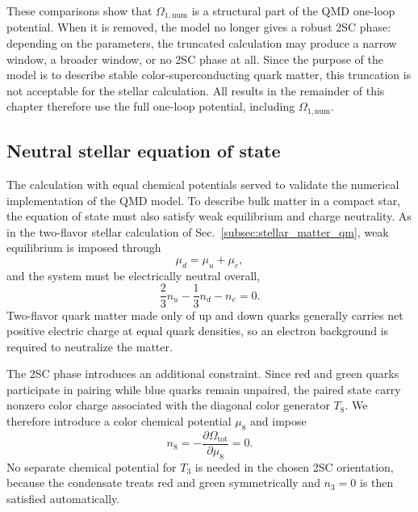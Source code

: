 These comparisons show that \(\Omega_{1,\mathrm{num}}\) is a structural
part of the QMD one-loop potential. When it is removed, the model no
longer gives a robust 2SC phase: depending on the parameters, the
truncated calculation may produce a narrow window, a broader window, or
no 2SC phase at all. Since the purpose of the model is to describe
stable color-superconducting quark matter, this truncation is not
acceptable for the stellar calculation. All results in the remainder of
this chapter therefore use the full one-loop potential, including
\(\Omega_{1,\mathrm{num}}\).

\subsection*{Neutral stellar equation of state}
\label{subsec:neutral_stellar_eos}

The calculation with equal chemical potentials served to validate the numerical
implementation of the QMD model. To describe bulk matter in a compact
star, the equation of state must also satisfy weak equilibrium and
charge neutrality. As in the two-flavor stellar calculation of
Sec.~\ref{subsec:stellar_matter_qm}, weak equilibrium is imposed through
\begin{equation}
\mu_d = \mu_u + \mu_e,
\end{equation}
and the system must be electrically neutral overall,
\begin{equation}
\frac{2}{3}n_u-\frac{1}{3}n_d-n_e=0.
\end{equation}
Two-flavor quark matter made only of up and down quarks generally carries
net positive electric charge at equal quark densities, so an electron
background is required to neutralize the matter.

The 2SC phase introduces an additional constraint. Since red and green
quarks participate in pairing while blue quarks remain unpaired, the
paired state carry nonzero color charge associated with the diagonal
color generator \(T_8\). We therefore introduce a color chemical
potential \(\mu_8\) and impose
\begin{equation}
n_8
=
-\frac{\partial\Omega_\mathrm{tot}}{\partial\mu_8}
=
0.
\end{equation}
No separate chemical potential for \(T_3\) is needed in the chosen 2SC
orientation, because the condensate treats red and green symmetrically
and \(n_3=0\) is then satisfied automatically.


